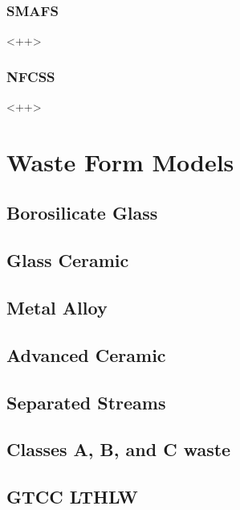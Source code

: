 \subsubsection{SMAFS}<++>
\subsubsection{NFCSS}<++>
\section{Waste Form Models}
\subsection{Borosilicate Glass}
\subsection{Glass Ceramic}
\subsection{Metal Alloy}
\subsection{Advanced Ceramic}
\subsection{Separated Streams}
\subsection{Classes A, B, and C waste}
\subsection{GTCC LTHLW}





